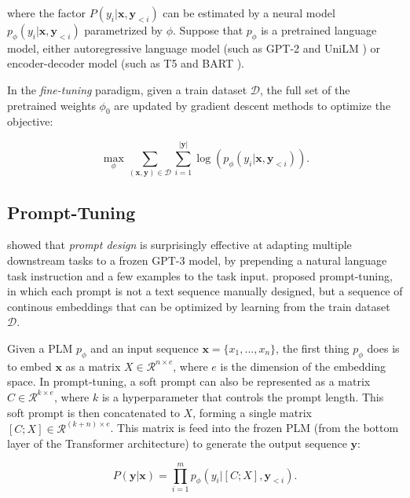 where the factor $P(y_i|\mathbf{x}, \mathbf{y}_{< i})$ can be estimated by a neural model $p_\phi(y_i|\mathbf{x}, \mathbf{y}_{< i})$ parametrized by $\phi$.
Suppose that $p_\phi$ is a pretrained language model, either autoregressive language model (such as GPT-2 \cite{brown2020language} and UniLM \cite{dongunified}) or encoder-decoder model (such as T5 \cite{raffel2020exploring} and BART \cite{lewisetal2020bart}).

In the \emph{fine-tuning} paradigm, given a train dataset $\mathcal{D}$, the full set of the pretrained weights $\phi_0$ are updated by gradient descent methods to optimize the objective:

\begin{equation}
\max_\phi\sum_{(\mathbf{x}, \mathbf{y})\in \mathcal{D}}\sum_{i=1}^{|\mathbf{y}|}\log {(p_\phi(y_i|\mathbf{x}, \mathbf{y}_{< i}))}.
\end{equation}

\subsection{Prompt-Tuning}

\citet{NEURIPS2020_1457c0d6} showed that \emph{prompt design} is surprisingly effective at adapting multiple downstream tasks to a frozen GPT-3 model, by prepending a natural language task instruction and a few examples to the task input.
\citet{lester2021power} proposed prompt-tuning, in which each prompt is not a text sequence manually designed, but a sequence of continous embeddings that can be optimized by learning from the train dataset $\mathcal{D}$.

Given a PLM $p_\phi$ and an input sequence $\mathbf{x}=\{x_1, ..., x_n\}$, the first thing $p_\phi$ does is to embed $\mathbf{x}$ as a matrix $\mathit{X}\in\mathcal{R}^{n\times e}$, where $e$ is the dimension of the embedding space. In prompt-tuning, a soft prompt can also be represented as a matrix $\mathit{C}\in\mathcal{R}^{k\times e}$, where $k$ is a hyperparameter that controls the prompt length. This soft prompt is then concatenated to $\mathit{X}$, forming a single matrix $[\mathit{C};\mathit{X}]\in\mathcal{R}^{(k+n)\times e}$. This matrix is feed into the frozen PLM (from the bottom layer of the Transformer architecture) to generate the output sequence $\mathbf{y}$:

\begin{equation}
P(\mathbf{y}|\mathbf{x})=\prod_{i=1}^{m}{p_\phi(y_i|[\mathit{C};\mathit{X}], \mathbf{y}_{< i})}.
\end{equation}

